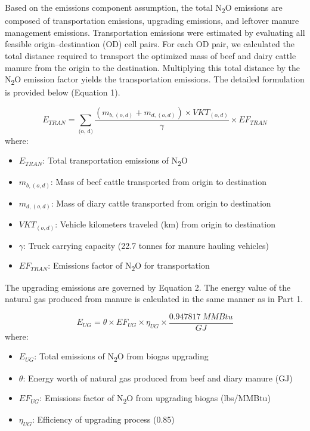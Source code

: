 \documentclass[12pt]{article}
\begin{document}
Based on the emissions component assumption, the total N\textsubscript{2}O emissions are composed of transportation emissions, upgrading emissions, and leftover manure management emissions. Transportation emissions were estimated by evaluating all feasible origin–destination (OD) cell pairs. For each OD pair, we calculated the total distance required to transport the optimized mass of beef and dairy cattle manure from the origin to the destination. Multiplying this total distance by the N\textsubscript{2}O emission factor yields the transportation emissions. The detailed formulation is provided below (Equation 1).

\begin{equation}
  E_{TRAN} = \sum_{\text{(o, d)}}\frac{(m_{b, (o, d)} + m_{d, (o, d)}) \times VKT_{(o, d)}}{\gamma} \times EF_{TRAN}
\end{equation}
where:
\begin{itemize}
  \item $E_{TRAN}$: Total transportation emissions of N\textsubscript{2}O
  \item $m_{b, (o, d)}$: Mass of beef cattle transported from origin to destination
  \item $m_{d, (o, d)}$: Mass of diary cattle transported from origin to destination
  \item $VKT_{(o, d)}$: Vehicle kilometers traveled (km) from origin to destination
  \item $\gamma$: Truck carrying capacity (22.7 tonnes for manure hauling vehicles)
  \item $EF_{TRAN}$: Emissions factor of N\textsubscript{2}O for transportation
\end{itemize}

The upgrading emissions are governed by Equation 2. The energy value of the natural gas produced from manure is calculated in the same manner as in Part 1.

\begin{equation}
  E_{UG} = \theta \times EF_{UG} \times \eta_{UG} \times \frac{0.947817 \ MMBtu}{GJ}
\end{equation}
where:
\begin{itemize}
  \item $E_{UG}$: Total emissions of N\textsubscript{2}O from biogas upgrading
  \item $\theta$: Energy worth of natural gas produced from beef and diary manure (GJ)
  \item $EF_{UG}$: Emissions factor of N\textsubscript{2}O from upgrading biogas (lbs/MMBtu)
  \item $\eta_{UG}$: Efficiency of upgrading process (0.85)
\end{itemize}
\end{document}

